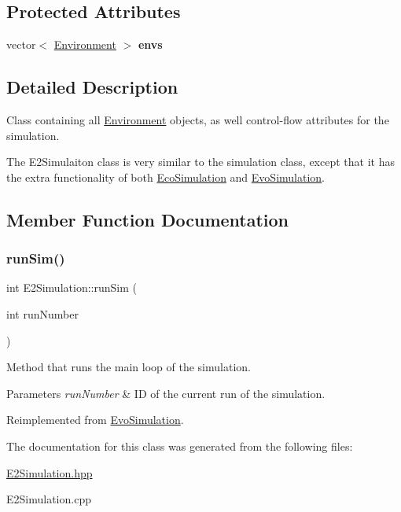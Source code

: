\subsection*{Protected Attributes}
\begin{DoxyCompactItemize}
\item 
\hypertarget{classE2Simulation_a72c3fa1a40648aeb904c6afb74dbb700}{}\label{classE2Simulation_a72c3fa1a40648aeb904c6afb74dbb700} 
vector$<$ \hyperlink{classEnvironment}{Environment} $>$ {\bfseries envs}
\end{DoxyCompactItemize}


\subsection{Detailed Description}
Class containing all \hyperlink{classEnvironment}{Environment} objects, as well control-\/flow attributes for the simulation. 

The E2\+Simulaiton class is very similar to the simulation class, except that it has the extra functionality of both \hyperlink{classEcoSimulation}{Eco\+Simulation} and \hyperlink{classEvoSimulation}{Evo\+Simulation}. 

\subsection{Member Function Documentation}
\hypertarget{classE2Simulation_a28028881fd443d2445b562512cb2169c}{}\label{classE2Simulation_a28028881fd443d2445b562512cb2169c} 
\subsubsection{\texorpdfstring{run\+Sim()}{runSim()}}
{\footnotesize\ttfamily int E2\+Simulation\+::run\+Sim (\begin{DoxyParamCaption}\item[{int}]{run\+Number }\end{DoxyParamCaption})\hspace{0.3cm}{\ttfamily [virtual]}}



Method that runs the main loop of the simulation. 


\begin{DoxyParams}{Parameters}
{\em run\+Number} & ID of the current run of the simulation. \\
\hline
\end{DoxyParams}


Reimplemented from \hyperlink{classEvoSimulation_aa43aa351dec24c638e56995a67a4f0f5}{Evo\+Simulation}.



The documentation for this class was generated from the following files\+:\begin{DoxyCompactItemize}
\item 
\hyperlink{E2Simulation_8hpp}{E2\+Simulation.\+hpp}\item 
E2\+Simulation.\+cpp\end{DoxyCompactItemize}
